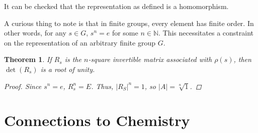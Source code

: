\documentclass[openany, amssymb, psamsfonts]{amsart}
\newtheorem{thm}{Theorem}[section]
\theoremstyle{definition}
\numberwithin{equation}{section}
\begin{document}
It can be checked that the representation as defined is a homomorphism.\par
A curious thing to note is that in finite groups, every element has finite order. In other words, for any $s\in G$, $s^n=e$ for some $n\in\mathbb{N}$. This necessitates a constraint on the representation of an arbitrary finite group $G$.
\begin{thm}
    If $R_s$ is the $n$-square invertible matrix associated with $\rho(s)$, then $\det(R_s)$ is a root of unity.
    \begin{proof}
        Since $s^n=e$, $R_s^n=E$. Thus, $|R_S|^n=1$, so $|A|=\sqrt[n]{1}$.
    \end{proof}
\end{thm}



\section{Connections to Chemistry}
\end{document}
